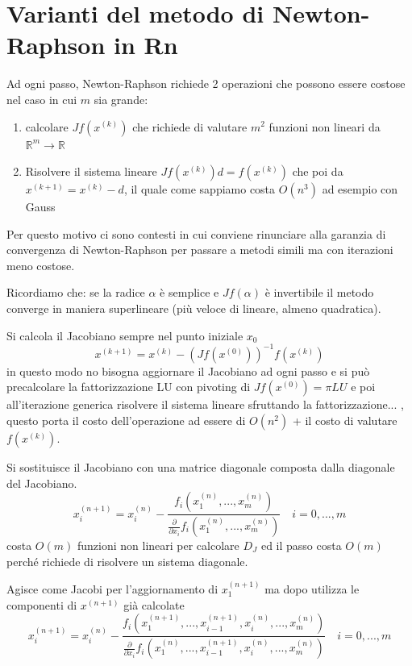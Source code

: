 \documentclass[12pt,a4paper,]{report}
\begin{document}
\section{Varianti del metodo di Newton-Raphson in Rn}
Ad ogni passo, Newton-Raphson richiede 2 operazioni che possono essere costose nel caso in cui $m$ sia grande:
\begin{enumerate}
    \item calcolare $Jf(x^{(k)})$ che richiede di valutare $m^2$ funzioni non lineari da $\mathbb{R}^m \to \mathbb{R}$
    \item Risolvere il sistema lineare $Jf(x^{(k)})d = f(x^{(k)})$ che poi da $x^{(k+1)} = x^{(k)} - d$, il quale come sappiamo costa $O(n^3)$ ad esempio con Gauss
\end{enumerate}
Per questo motivo ci sono contesti in cui conviene rinunciare alla garanzia di convergenza di Newton-Raphson per passare a metodi simili ma con iterazioni meno costose.
\begin{nota}
    Ricordiamo che: se la radice $\alpha$ è semplice e $Jf(\alpha)$ è invertibile il metodo converge in maniera superlineare (più veloce di lineare, almeno quadratica).
\end{nota}

\begin{metodo}
    Si calcola il Jacobiano sempre nel punto iniziale $x_0$
    \[
    x^{(k+1)} = x^{(k)} - (Jf(x^{(0)}))^{-1}f(x^{(k)})
    \]
    in questo modo no bisogna aggiornare il Jacobiano ad ogni passo e si può precalcolare la fattorizzazione LU con pivoting di $Jf(x^{(0)})=\pi LU$ e poi all'iterazione generica risolvere il sistema lineare sfruttando la fattorizzazione...%
    , questo porta il costo dell'operazione ad essere di $O(n^2)$ + il costo di valutare $f(x^{(k)})$.
\end{metodo}
\begin{metodo}
    Si sostituisce il Jacobiano con una matrice diagonale composta dalla diagonale del Jacobiano.
    \[
    x_i^{(n+1)} = x_i^{(n)} - \frac{f_i(x_1^{(n)},...,x_m^{(n)})}{\frac{\partial }{\partial x_i}f_i(x_1^{(n)},...,x_m^{(n)})} 
    \quad i=0,...,m
    \]
    costa $O(m)$ funzioni non lineari per calcolare $D_J$ ed il passo costa $O(m)$ perché richiede di risolvere un sistema diagonale.
\end{metodo}
\begin{metodo}
    Agisce come Jacobi per l'aggiornamento di $x_1^{(n+1)}$ ma dopo utilizza le componenti di $x^{(n+1)}$ già calcolate
    \[
    x_i^{(n+1)} = x_i^{(n)} - \frac{f_i(x_1^{(n+1)},...,x_{i-1}^{(n+1)},x_i^{(n)},...,x_m^{(n)})}{\frac{\partial }{\partial x_i}f_i(x_1^{(n)},...,x_{i-1}^{(n+1)},x_i^{(n)},...,x_m^{(n)})} 
    \quad i=0,...,m
    \]
\end{metodo}
\end{document}
